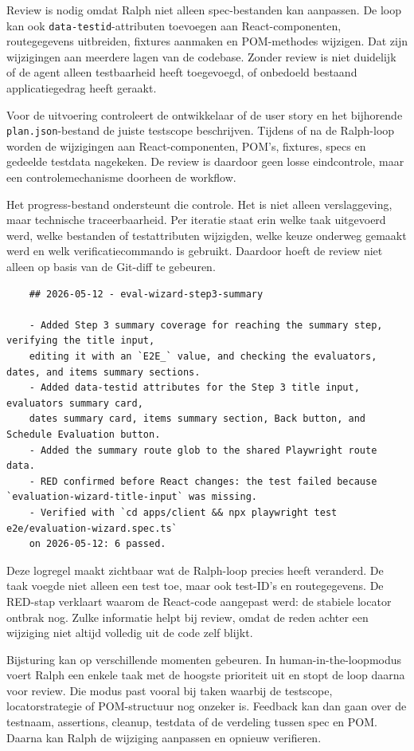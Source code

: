 Review is nodig omdat Ralph niet alleen spec-bestanden kan aanpassen. De loop kan ook \texttt{data-testid}-attributen toevoegen aan React-componenten, routegegevens uitbreiden, fixtures aanmaken en POM-methodes wijzigen. Dat zijn wijzigingen aan meerdere lagen van de codebase. Zonder review is niet duidelijk of de agent alleen testbaarheid heeft toegevoegd, of onbedoeld bestaand applicatiegedrag heeft geraakt.

Voor de uitvoering controleert de ontwikkelaar of de user story en het bijhorende \texttt{plan.json}-bestand de juiste testscope beschrijven. Tijdens of na de Ralph-loop worden de wijzigingen aan React-componenten, POM's, fixtures, specs en gedeelde testdata nagekeken. De review is daardoor geen losse eindcontrole, maar een controlemechanisme doorheen de workflow.

Het progress-bestand ondersteunt die controle. Het is niet alleen verslaggeving, maar technische traceerbaarheid. Per iteratie staat erin welke taak uitgevoerd werd, welke bestanden of testattributen wijzigden, welke keuze onderweg gemaakt werd en welk verificatiecommando is gebruikt. Daardoor hoeft de review niet alleen op basis van de Git-diff te gebeuren.

\begin{verbatim}
    ## 2026-05-12 - eval-wizard-step3-summary
    
    - Added Step 3 summary coverage for reaching the summary step, verifying the title input,
    editing it with an `E2E_` value, and checking the evaluators, dates, and items summary sections.
    - Added data-testid attributes for the Step 3 title input, evaluators summary card,
    dates summary card, items summary section, Back button, and Schedule Evaluation button.
    - Added the summary route glob to the shared Playwright route data.
    - RED confirmed before React changes: the test failed because `evaluation-wizard-title-input` was missing.
    - Verified with `cd apps/client && npx playwright test e2e/evaluation-wizard.spec.ts`
    on 2026-05-12: 6 passed.
\end{verbatim}

Deze logregel maakt zichtbaar wat de Ralph-loop precies heeft veranderd. De taak voegde niet alleen een test toe, maar ook test-ID's en routegegevens. De RED-stap verklaart waarom de React-code aangepast werd: de stabiele locator ontbrak nog. Zulke informatie helpt bij review, omdat de reden achter een wijziging niet altijd volledig uit de code zelf blijkt.

Bijsturing kan op verschillende momenten gebeuren. In human-in-the-loopmodus voert Ralph een enkele taak met de hoogste prioriteit uit en stopt de loop daarna voor review. Die modus past vooral bij taken waarbij de testscope, locatorstrategie of POM-structuur nog onzeker is. Feedback kan dan gaan over de testnaam, assertions, cleanup, testdata of de verdeling tussen spec en POM. Daarna kan Ralph de wijziging aanpassen en opnieuw verifieren.

